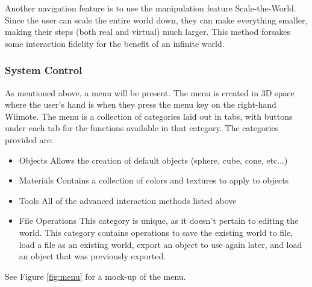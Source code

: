 Another navigation feature is to use the manipulation feature Scale-the-World.
Since the user can scale the entire world down, they can make everything smaller, making their steps (both real and virtual) much larger.
This method forsakes some interaction fidelity for the benefit of an infinite world.

\subsubsection{System Control}
\label{Design:Interaction:SystemControl}
As mentioned above, a menu will be present.
The menu is created in 3D space where the user's hand is when they press the menu key on the right-hand Wiimote.
The menu is a collection of categories laid out in tabs, with buttons under each tab for the functions available in that category.
The categories provided are:
\begin{itemize}
	\item Objects
	\subitem Allows the creation of default objects (sphere, cube, cone, etc...)
	\item Materials
	\subitem Contains a collection of colors and textures to apply to objects
	\item Tools
	\subitem All of the advanced interaction methods listed above
	\item File Operations
	\subitem This category is unique, as it doesn't pertain to editing the world.  This category contains operations to save the existing world to file, load a file as an existing world, export an object to use again later, and load an object that was previously exported.
\end{itemize}


See Figure \ref{fig:menu} for a mock-up of the menu.


